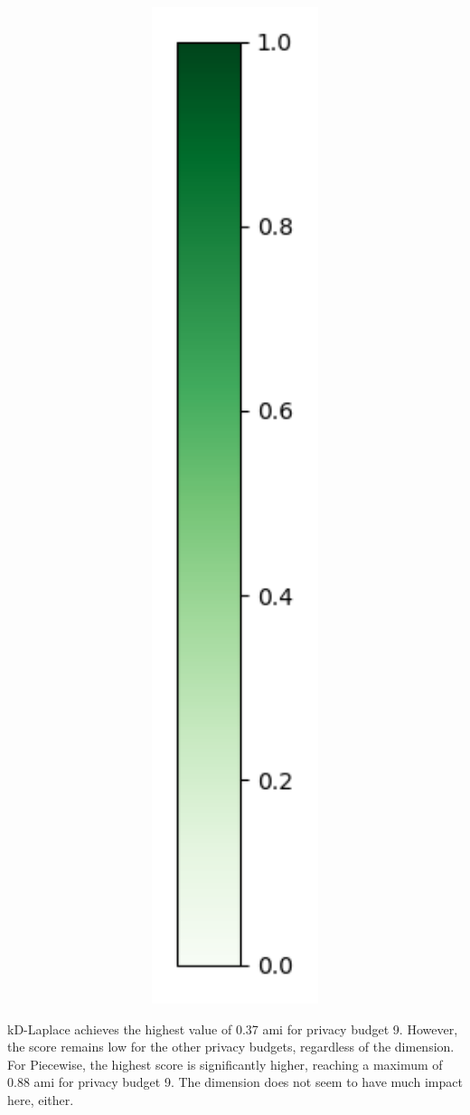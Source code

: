 \begin{figure}[H]
\begin{subfigure}[b]{0.075\textwidth}
            \includegraphics[width=1\textwidth]{Results/kd-laplace/kd-Laplace/seeds-dataset/heatmap_legend.png}
      \end{subfigure}
\end{figure}
kD-Laplace achieves the highest value of 0.37 \gls{ami} for privacy budget 9. However, the score remains low for the other privacy budgets, regardless of the dimension.
For Piecewise, the highest score is significantly higher, reaching a maximum of 0.88 \gls{ami} for privacy budget 9. The dimension does not seem to have much impact here, either.
\newpage
